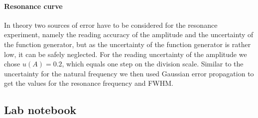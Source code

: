\documentclass{article}
\begin{document}
\paragraph{Resonance curve}
In theory two sources of error have to be considered for the resonance experiment, namely the reading accuracy of the amplitude and the uncertainty of the function generator, but as the uncertainty of the function generator is rather low, it can be safely neglected. For the reading uncertainty of the amplitude we chose $u(A) = 0.2$, which equals one step on the division scale. Similar to the uncertainty for the natural frequency we then used Gaussian error propagation to get the values for the resonance frequency and FWHM.
\subsection{Lab notebook} 

\end{document}
